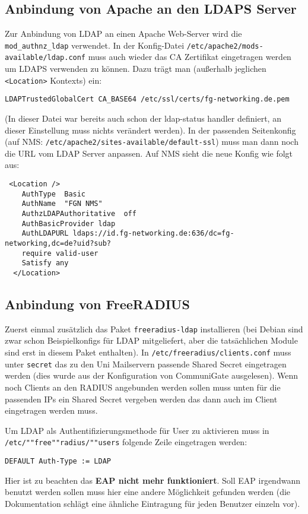 \documentclass[11pt,a4paper,titlepage=firstiscover]{scrartcl} %
\begin{document}
\subsection{Anbindung von Apache an den LDAPS Server}
Zur Anbindung von LDAP an einen Apache Web-Server wird die \texttt{mod\_authnz\_ldap} verwendet. In der Konfig-Datei \texttt{/etc/apache2/mods-available/ldap.conf} muss auch wieder das CA Zertifikat eingetragen werden um LDAPS verwenden zu können. Dazu trägt man (außerhalb jeglichen \texttt{<Location>} Kontexts) ein:
\begin{lstlisting}
LDAPTrustedGlobalCert CA_BASE64 /etc/ssl/certs/fg-networking.de.pem
\end{lstlisting}
(In dieser Datei war bereits auch schon der ldap-status handler definiert, an dieser Einstellung muss nichts verändert werden). In der passenden Seitenkonfig (auf NMS: \texttt{/etc/apache2/sites-available/default-ssl}) muss man dann noch die URL vom LDAP Server anpassen. Auf NMS sieht die neue Konfig wie folgt aus:
\begin{lstlisting}
 <Location />
    AuthType  Basic
    AuthName  "FGN NMS"
    AuthzLDAPAuthoritative  off
    AuthBasicProvider ldap
    AuthLDAPURL ldaps://id.fg-networking.de:636/dc=fg-networking,dc=de?uid?sub?
    require valid-user
    Satisfy any
  </Location>
\end{lstlisting}


\subsection{Anbindung von FreeRADIUS}
Zuerst einmal zusätzlich das Paket \texttt{freeradius-ldap} installieren (bei Debian sind zwar schon Beispielkonfigs für LDAP mitgeliefert, aber die tatsächlichen Module sind erst in diesem Paket enthalten). In \texttt{/etc/freeradius/clients.conf} muss unter \texttt{secret} das zu den Uni Mailservern passende Shared Secret eingetragen werden (dies wurde aus der Konfiguration von CommuniGate ausgelesen). Wenn noch Clients an den RADIUS angebunden werden sollen muss unten für die passenden IPs ein Shared Secret vergeben werden das dann auch im Client eingetragen werden muss.

Um LDAP als Authentifizierungsmethode für User zu aktivieren muss in \texttt{/etc/""free""radius/""users} folgende Zeile eingetragen werden:
\begin{lstlisting}
DEFAULT Auth-Type := LDAP
\end{lstlisting}
Hier ist zu beachten das \textbf{EAP nicht mehr funktioniert}. Soll EAP irgendwann benutzt werden sollen muss hier eine andere Möglichkeit gefunden werden (die Dokumentation schlägt eine ähnliche Eintragung für jeden Benutzer einzeln vor).
\end{document}
